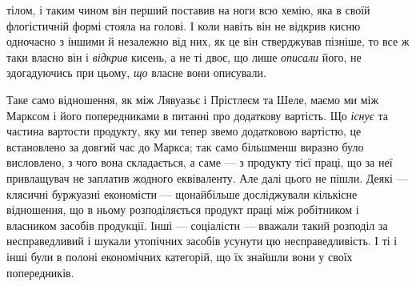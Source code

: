 \parcont{}  %
тілом, і таким чином він перший поставив на ноги всю хемію, яка в
своїй флогістичній формі стояла на голові. І коли навіть він не відкрив
кисню одночасно з іншими й незалежно від них, як це він стверджував
пізніше, то все ж таки власно він і \emph{відкрив} кисень, а не ті двоє, що
лише \emph{описали} його, не здогадуючись при цьому, \emph{що} власне вони
описували.

Таке само відношення, як між Лявуазьє і Прістлеєм та Шеле, маємо
ми між Марксом і його попередниками в питанні про додаткову вартість.
Що \emph{існує} та частина вартости продукту, яку ми тепер звемо додатковою
вартістю, це встановлено за довгий час до Маркса; так само більшменш
виразно було висловлено, з чого вона складається, а саме —
з продукту тієї праці, що за неї привлащувач не заплатив жодного еквіваленту.
Але далі цього не пішли. Деякі — клясичні буржуазні економісти —
щонайбільше досліджували кількісне відношення, що в ньому розподіляється
продукт праці між робітником і власником засобів продукції.
Інші — соціалісти — вважали такий розподіл за несправедливий і шукали
утопічних засобів усунути цю несправедливість. І ті і інші були в полоні
економічних категорій, що їх знайшли вони у своїх попередників.

